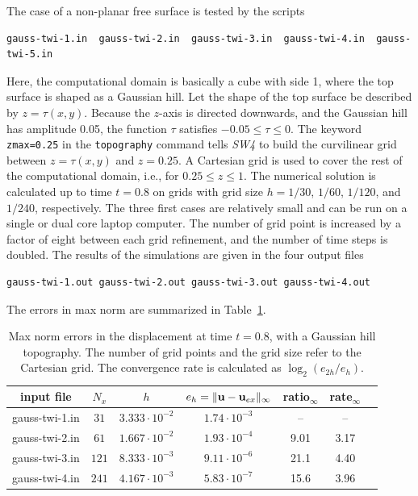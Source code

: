 \documentclass[11pt]{report}
\newcommand{\ub}{{\bf u}}
\begin{document}
{The case of a non-planar free surface is tested by the scripts
\begin{verbatim}
gauss-twi-1.in  gauss-twi-2.in  gauss-twi-3.in  gauss-twi-4.in  gauss-twi-5.in
\end{verbatim}
Here, the computational domain is basically a cube with side 1, where the top surface is shaped as a
Gaussian hill. Let the shape of the top surface be described by $z=\tau(x,y)$. Because the $z$-axis
is directed downwards, and the Gaussian hill has amplitude 0.05, the function $\tau$ satisfies
$-0.05\leq \tau\leq 0$. The keyword {\tt zmax=0.25} in the {\tt topography} command tells
\emph{SW4} to build the curvilinear grid between $z=\tau(x,y)$ and $z=0.25$. A Cartesian grid is
used to cover the rest of the computational domain, i.e., for $0.25\leq z\leq 1$. The numerical
solution is calculated up to time $t=0.8$ on grids with grid size $h=1/30$, $1/60$, $1/120$,
and $1/240$, respectively. The three first cases are relatively small and can be run on a
single or dual core laptop computer. The number of grid point is increased by a factor of eight
between each grid refinement, and the number of time steps is doubled.
The results of the simulations are given in the four output files
\begin{verbatim}
gauss-twi-1.out gauss-twi-2.out gauss-twi-3.out gauss-twi-4.out
\end{verbatim}
The errors in max norm are summarized in Table~\ref{tab:twi-gauss-err}.
\begin{table}
	\begin{center}
		\begin{tabular}{| c | c | c | c | c | c  | c | }
			\hline
			input file     & $N_x$ & $h$                  & $e_h=\| \ub - \ub_{ex}\|_\infty$ & ratio$_\infty$ & rate$_\infty$ \\ \hline
			gauss-twi-1.in & $31$  & $3.333\cdot 10^{-2}$ & $1.74\cdot 10^{-3}$              & --             & --            \\ \hline
			gauss-twi-2.in & $61$  & $1.667\cdot 10^{-2}$ & $1.93\cdot 10^{-4}$              & 9.01           & 3.17          \\ \hline
			gauss-twi-3.in & $121$ & $8.333\cdot 10^{-3}$ & $9.11\cdot 10^{-6}$              & 21.1           & 4.40          \\ \hline
			gauss-twi-4.in & $241$ & $4.167\cdot 10^{-3}$ & $5.83\cdot 10^{-7}$              & 15.6           & 3.96          \\ \hline
		\end{tabular}
		\caption{Max norm errors in the displacement at time $t=0.8$, with a Gaussian hill topography. The
			number of grid points and the grid size refer to the Cartesian grid. The convergence rate is
			calculated as $\log_2(e_{2h}/e_h)$. }
		\label{tab:twi-gauss-err}
	\end{center}
\end{table}

}
\end{document}
